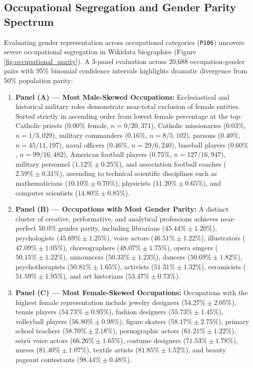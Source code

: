 \documentclass[11pt,a4paper]{article}
\begin{document}
\subsection{Occupational Segregation and Gender Parity Spectrum}
Evaluating gender representation across occupational categories (\texttt{P106}) uncovers severe occupational segregation in Wikidata biographies (Figure \ref{fig:occupational_parity}). A 3-panel evaluation across 20,688 occupation-gender pairs with 95\% binomial confidence intervals highlights dramatic divergence from 50\% population parity:
\begin{enumerate}
    \item \textbf{Panel (A) — Most Male-Skewed Occupations:} Ecclesiastical and historical military roles demonstrate near-total exclusion of female entities. Sorted strictly in ascending order from lowest female percentage at the top: Catholic priests ($0.00\%$ female, $n=0/20,371$), Catholic missionaries ($0.03\%$, $n=1/3,029$), military commanders ($0.16\%$, $n=8/5,102$), parsons ($0.40\%$, $n=45/11,197$), naval officers ($0.46\%$, $n=29/6,240$), baseball players ($0.60\%$, $n=99/16,482$), American football players ($0.75\%$, $n=127/16,947$), military personnel ($1.12\% \pm 0.25\%$), and association football coaches ($2.59\% \pm 0.31\%$), ascending to technical scientific disciplines such as mathematicians ($10.10\% \pm 0.70\%$), physicists ($11.20\% \pm 0.65\%$), and computer scientists ($14.80\% \pm 0.85\%$).
    \item \textbf{Panel (B) — Occupations with Most Gender Parity:} A distinct cluster of creative, performative, and analytical professions achieves near-perfect 50.0\% gender parity, including librarians ($45.44\% \pm 1.20\%$), psychologists ($45.69\% \pm 1.25\%$), voice actors ($46.51\% \pm 1.22\%$), illustrators ($47.09\% \pm 1.05\%$), choreographers ($48.07\% \pm 1.75\%$), opera singers ($50.15\% \pm 1.22\%$), announcers ($50.33\% \pm 1.23\%$), dancers ($50.69\% \pm 1.82\%$), psychotherapists ($50.81\% \pm 1.65\%$), activists ($51.31\% \pm 1.32\%$), ceramicists ($51.59\% \pm 1.95\%$), and art historians ($53.47\% \pm 0.73\%$).
    \item \textbf{Panel (C) — Most Female-Skewed Occupations:} Occupations with the highest female representation include jewelry designers ($54.27\% \pm 2.05\%$), tennis players ($54.73\% \pm 0.95\%$), fashion designers ($55.73\% \pm 1.45\%$), volleyball players ($56.80\% \pm 0.98\%$), figure skaters ($58.17\% \pm 2.75\%$), primary school teachers ($58.70\% \pm 2.18\%$), pornographic actors ($61.21\% \pm 1.22\%$), seiy\={u} voice actors ($66.26\% \pm 1.65\%$), costume designers ($71.53\% \pm 1.78\%$), nurses ($81.40\% \pm 1.07\%$), textile artists ($81.85\% \pm 1.52\%$), and beauty pageant contestants ($98.44\% \pm 0.48\%$).
\end{enumerate}
\end{document}
